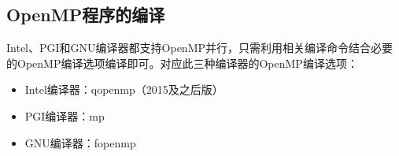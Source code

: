 \documentclass[a4paper,12pt,english]{sphinxmanual}
\begin{document}
\subsection{OpenMP程序的编译}
\label{\detokenize{serial-compiling/serial-compiling:id8}}
\sphinxAtStartPar
Intel、PGI和GNU编译器都支持OpenMP并行，只需利用相关编译命令结合必要的OpenMP编译选项编译即可。对应此三种编译器的OpenMP编译选项：
\begin{itemize}
\item {} 
\sphinxAtStartPar
Intel编译器：\sphinxhyphen{}qopenmp（2015及之后版）

\item {} 
\sphinxAtStartPar
PGI编译器：\sphinxhyphen{}mp

\item {} 
\sphinxAtStartPar
GNU编译器：\sphinxhyphen{}fopenmp

\end{itemize}
\end{document}
